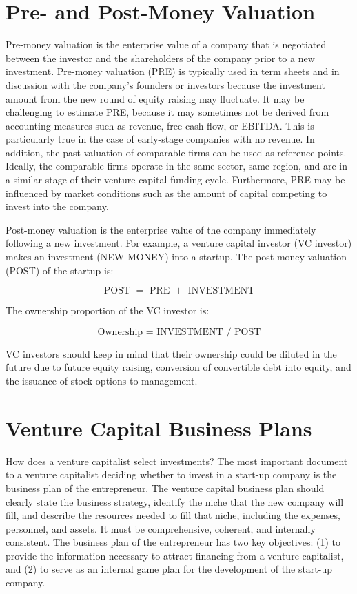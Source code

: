 \documentclass[11pt]{article}
\begin{document}
\section*{Pre- and Post-Money Valuation}
Pre-money valuation is the enterprise value of a company that is negotiated between the investor and the shareholders of the company prior to a new investment. Pre-money valuation (PRE) is typically used in term sheets and in discussion with the company's founders or investors because the investment amount from the new round of equity raising may fluctuate. It may be challenging to estimate PRE, because it may sometimes not be derived from accounting measures such as revenue, free cash flow, or EBITDA. This is particularly true in the case of early-stage companies with no revenue. In addition, the past valuation of comparable firms can be used as reference points. Ideally, the comparable firms operate in the same sector, same region, and are in a similar stage of their venture capital funding cycle. Furthermore, PRE may be influenced by market conditions such as the amount of capital competing to invest into the company.

Post-money valuation is the enterprise value of the company immediately following a new investment. For example, a venture capital investor (VC investor) makes an investment (NEW MONEY) into a startup. The post-money valuation (POST) of the startup is:


\begin{equation*}
\text { POST }=\text { PRE }+ \text { INVESTMENT } \tag{2}
\end{equation*}


The ownership proportion of the VC investor is:


\begin{equation*}
\text { Ownership = INVESTMENT } / \text { POST } \tag{3}
\end{equation*}


VC investors should keep in mind that their ownership could be diluted in the future due to future equity raising, conversion of convertible debt into equity, and the issuance of stock options to management.

\section*{Venture Capital Business Plans}
How does a venture capitalist select investments? The most important document to a venture capitalist deciding whether to invest in a start-up company is the business plan of the entrepreneur. The venture capital business plan should clearly state the business strategy, identify the niche that the new company will fill, and describe the resources needed to fill that niche, including the expenses, personnel, and assets. It must be comprehensive, coherent, and internally consistent. The business plan of the entrepreneur has two key objectives: (1) to provide the information necessary to attract financing from a venture capitalist, and (2) to serve as an internal game plan for the development of the start-up company.
\end{document}
